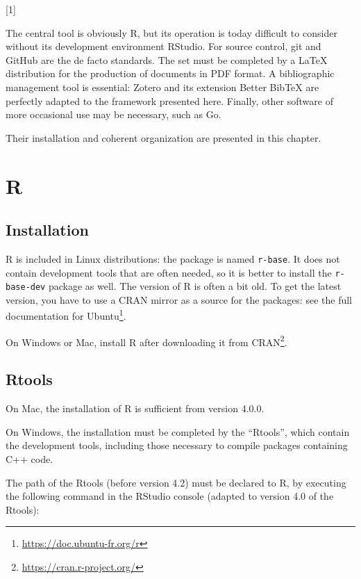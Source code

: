 \documentclass[
  12pt,
  american,
  a4paper,
  extrafontsizes,onecolumn,openright
  ]{memoir}
\newlength{\rf}
\newcommand{\toc}[1]{%
  \startcontents[chapters]%
  \printcontents[chapters]{}{1}[#1]{}%
  ~\newline%
}
\begin{document}
\toc{1}

The central tool is obviously R, but its operation is today difficult to consider without its development environment RStudio.
For source control, git and GitHub are the de facto standards.
The set must be completed by a LaTeX distribution for the production of documents in PDF format.
A bibliographic management tool is essential: Zotero and its extension Better BibTeX are perfectly adapted to the framework presented here.
Finally, other software of more occasional use may be necessary, such as Go.

Their installation and coherent organization are presented in this chapter.

\hypertarget{r}{%
\section{R}\label{r}}

\hypertarget{installation}{%
\subsection{Installation}\label{installation}}

R is included in Linux distributions: the package is named \texttt{r-base}.
It does not contain development tools that are often needed, so it is better to install the \texttt{r-base-dev} package as well.
The version of R is often a bit old.
To get the latest version, you have to use a CRAN mirror as a source for the packages: see the full documentation for Ubuntu\footnote{\url{https://doc.ubuntu-fr.org/r}}.

On Windows or Mac, install R after downloading it from CRAN\footnote{\url{https://cran.r-project.org/}}.

\hypertarget{rtools}{%
\subsection{Rtools}\label{rtools}}

On Mac, the installation of R is sufficient from version 4.0.0.

On Windows, the installation must be completed by the \enquote{Rtools}, which contain the development tools, including those necessary to compile packages containing C++ code.

The path of the Rtools (before version 4.2) must be declared to R, by executing the following command in the RStudio console (adapted to version 4.0 of the Rtools):
\end{document}
